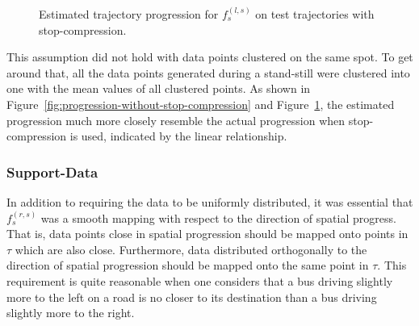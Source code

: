 \begin{figure}[H]
\begin{minipage}{.46\textwidth}
    \caption{Estimated trajectory progression for $f_s^{(l, s)}$ on test trajectories with stop-compression.}
    \label{fig:progression-with-stop-compression}
  \end{minipage}
\end{figure}

\noindent
This assumption did not hold with data points clustered on the same
spot. To get around that, all the data points generated during a
stand-still were clustered into one with the mean values of all
clustered points. As shown in
Figure~\ref{fig:progression-without-stop-compression} and
Figure~\ref{fig:progression-with-stop-compression}, the estimated
progression much more closely resemble the actual progression when stop-compression is used, indicated by the linear relationship.

\subsubsection{Support-Data}
\label{sec:support-data}
In addition to requiring the data to be uniformly distributed, it was essential that $f^{(r,s)}_s$ was a smooth mapping with respect to the direction of spatial progress. That is, data points close in spatial progression should be mapped onto points in $\tau$ which are also close. Furthermore, data distributed orthogonally to the direction of spatial progression should be mapped onto the same point in $\tau$. This requirement is quite reasonable when one considers that a bus driving slightly more to the left on a road is no closer to its destination than a bus driving slightly more to the right. 

